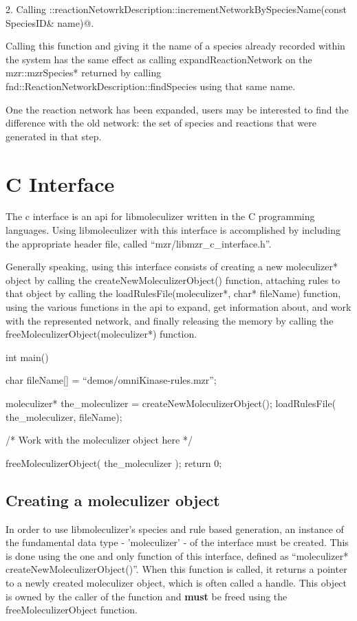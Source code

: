 2.  Calling
\lstinline@fnd::reactionNetowrkDescription::incrementNetworkBySpeciesName(const SpeciesID& name)@.  

Calling this function and giving it the name of a species already
recorded within the system has the same effect as calling
expandReactionNetwork on the mzr::mzrSpecies* returned by calling
fnd::ReactionNetworkDescription::findSpecies using that same name. 

One the reaction network has been expanded, users may be interested to
find the difference with the old network: the set of species and
reactions that were generated in that step.  


\section{C Interface}
The c interface is an api for libmoleculizer written in the C
programming languages.  Using libmoleculizer with this interface is
accomplished by including the appropriate header file, called
``mzr/libmzr\_c\_interface.h''. 

Generally speaking, using this interface consists of creating a new
moleculizer* object by calling the createNewMoleculizerObject()
function, attaching rules to that object by calling the
loadRulesFile(moleculizer*, char* fileName) function, using the
various functions in the api to expand, get information about, and
work with the represented network, and finally releasing the memory by
calling the freeMoleculizerObject(moleculizer*) function.  

\begin{ExampleC}[caption=Basic example using the c-interface]
  int main(){
    char fileName[] = ``demos/omniKinase-rules.mzr'';
    
    moleculizer* the_moleculizer = createNewMoleculizerObject();
    loadRulesFile( the_moleculizer, fileName);

    /* Work with the moleculizer object here */

    freeMoleculizerObject( the_moleculizer );
    return 0;
    }
\end{ExampleC}

\subsection{Creating a moleculizer object}
In order to use libmoleculizer's species and rule based generation,
an instance of the fundamental data type - 'moleculizer' - of the
interface must be created.  This is done using the one and only
function of this interface, defined as ``moleculizer*
createNewMoleculizerObject()''.  When this function is called, it
returns a pointer to a newly created moleculizer object, which is
often called a handle.  This object is owned by the caller of the
function and {\bf must} be freed using the freeMoleculizerObject
function.

